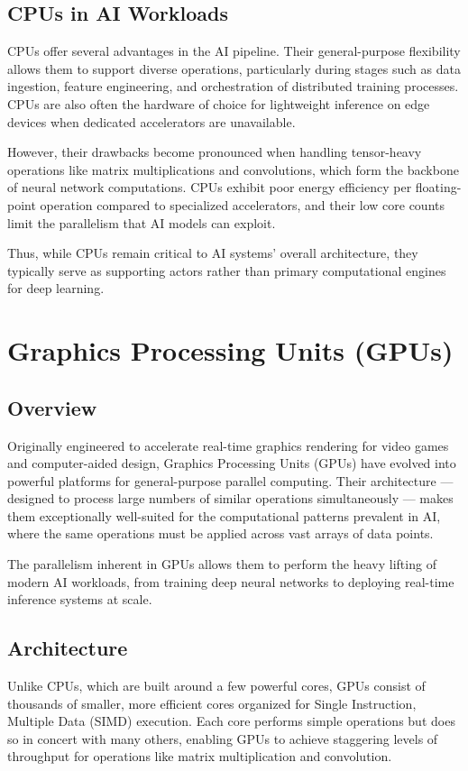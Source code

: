\documentclass[openany]{book}
\begin{document}
\subsection{CPUs in AI Workloads}
CPUs offer several advantages in the AI pipeline. Their general-purpose 
flexibility allows them to support diverse operations, particularly during 
stages such as data ingestion, feature engineering, and orchestration of 
distributed training processes. CPUs are also often the hardware of choice for 
lightweight inference on edge devices when dedicated accelerators are 
unavailable.

However, their drawbacks become pronounced when handling tensor-heavy operations 
like matrix multiplications and convolutions, which form the backbone of neural 
network computations. CPUs exhibit poor energy efficiency per floating-point 
operation compared to specialized accelerators, and their low core counts limit 
the parallelism that AI models can exploit.

Thus, while CPUs remain critical to AI systems' overall architecture, they 
typically serve as supporting actors rather than primary computational engines 
for deep learning.

\section{Graphics Processing Units (GPUs)}

\subsection{Overview}
Originally engineered to accelerate real-time graphics rendering for video games 
and computer-aided design, Graphics Processing Units (GPUs) have evolved into 
powerful platforms for general-purpose parallel computing. Their architecture — 
designed to process large numbers of similar operations simultaneously — makes 
them exceptionally well-suited for the computational patterns prevalent in AI, 
where the same operations must be applied across vast arrays of data points.

The parallelism inherent in GPUs allows them to perform the heavy lifting of 
modern AI workloads, from training deep neural networks to deploying real-time 
inference systems at scale.

\subsection{Architecture}
Unlike CPUs, which are built around a few powerful cores, GPUs consist of 
thousands of smaller, more efficient cores organized for Single Instruction, 
Multiple Data (SIMD) execution. Each core performs simple operations but does 
so in concert with many others, enabling GPUs to achieve staggering levels of 
throughput for operations like matrix multiplication and convolution.
\end{document}
